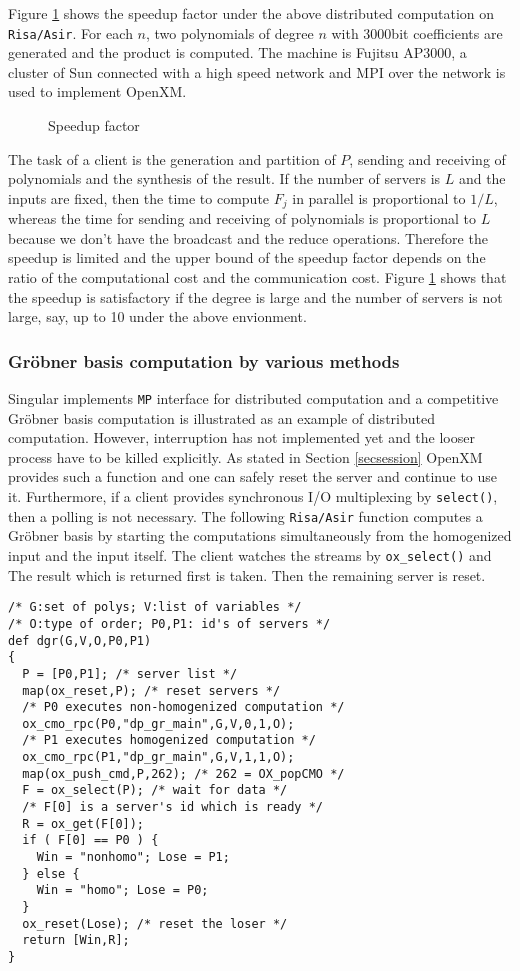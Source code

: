 Figure \ref{speedup}
shows the speedup factor under the above distributed computation
on {\tt Risa/Asir}. For each $n$, two polynomials of degree $n$
with 3000bit coefficients are generated and the product is computed.
The machine is Fujitsu AP3000,
a cluster of Sun connected with a high speed network and MPI over the
network is used to implement OpenXM.
\begin{figure}[htbp]
\epsfxsize=8.5cm
\caption{Speedup factor}
\label{speedup}
\end{figure}

The task of a client is the generation and partition of $P$, sending
and receiving of polynomials and the synthesis of the result. If the
number of servers is $L$ and the inputs are fixed, then the time to
compute $F_j$ in parallel is proportional to $1/L$, whereas the time
for sending and receiving of polynomials is proportional to $L$
because we don't have the broadcast and the reduce
operations. Therefore the speedup is limited and the upper bound of
the speedup factor depends on the ratio of 
the computational cost and the communication cost.
Figure \ref{speedup} shows that 
the speedup is satisfactory if the degree is large and the number of
servers is not large, say, up to 10 under the above envionment.

\subsubsection{Gr\"obner basis computation by various methods}

Singular \cite{Singular} implements {\tt MP} interface for distributed
computation and a competitive Gr\"obner basis computation is
illustrated as an example of distributed computation.  However,
interruption has not implemented yet and the looser process have to be
killed explicitly. As stated in Section \ref{secsession} OpenXM
provides such a function and one can safely reset the server and
continue to use it.  Furthermore, if a client provides synchronous I/O
multiplexing by {\tt select()}, then a polling is not necessary.  The
following {\tt Risa/Asir} function computes a Gr\"obner basis by
starting the computations simultaneously from the homogenized input and
the input itself.  The client watches the streams by {\tt ox\_select()}
and The result which is returned first is taken. Then the remaining
server is reset.

\begin{verbatim}
/* G:set of polys; V:list of variables */
/* O:type of order; P0,P1: id's of servers */
def dgr(G,V,O,P0,P1)
{
  P = [P0,P1]; /* server list */
  map(ox_reset,P); /* reset servers */
  /* P0 executes non-homogenized computation */
  ox_cmo_rpc(P0,"dp_gr_main",G,V,0,1,O);
  /* P1 executes homogenized computation */
  ox_cmo_rpc(P1,"dp_gr_main",G,V,1,1,O);
  map(ox_push_cmd,P,262); /* 262 = OX_popCMO */
  F = ox_select(P); /* wait for data */
  /* F[0] is a server's id which is ready */
  R = ox_get(F[0]);
  if ( F[0] == P0 ) {
    Win = "nonhomo"; Lose = P1;
  } else {
    Win = "homo"; Lose = P0;
  }
  ox_reset(Lose); /* reset the loser */
  return [Win,R];
}
\end{verbatim}

